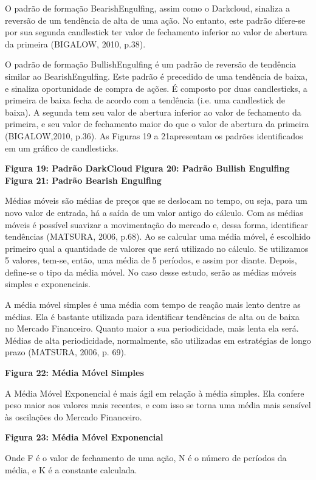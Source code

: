 O padrão de formação BearishEngulfing, assim como o Darkcloud, sinaliza a reversão de um tendência de alta de uma ação. No entanto, este padrão difere-se por sua segunda candlestick ter valor de fechamento inferior ao valor de abertura da primeira (BIGALOW, 2010, p.38).

O padrão de formação BullishEngulfing é um padrão de reversão de tendência similar ao BearishEngulfing. Este padrão é precedido de uma tendência de baixa, e sinaliza oportunidade de compra de ações. É composto por duas candlesticks, a primeira de baixa fecha de acordo com a tendência (i.e. uma candlestick de baixa). A segunda tem seu valor de abertura inferior ao valor de fechamento da primeira, e seu valor de fechamento maior do que o valor de abertura da primeira (BIGALOW,2010, p.36). As Figuras 19 a 21apresentam os padrões identificados em um gráfico de candlesticks.

\textbf{Figura 19: Padrão DarkCloud}
\textbf{Figura 20: Padrão Bullish Engulfing}
\textbf{Figura 21: Padrão Bearish Engulfing}


Médias móveis são médias de preços que se deslocam no tempo, ou seja, para um novo valor de entrada, há a saída de um valor antigo do cálculo. Com as médias móveis é possível suavizar a movimentação do mercado e, dessa forma, identificar tendências (MATSURA, 2006, p.68). Ao se calcular uma média móvel, é escolhido primeiro qual a quantidade de valores que será utilizado no cálculo. Se utilizamos 5 valores, tem-se, então, uma média de 5 períodos, e assim por diante. Depois, define-se o tipo da média móvel. No caso desse estudo, serão as médias móveis simples e exponenciais.

A média móvel simples é uma média com tempo de reação mais lento dentre as médias. Ela é bastante utilizada para identificar tendências de alta ou de baixa no Mercado Financeiro. Quanto maior a sua periodicidade, mais lenta ela será. Médias de alta periodicidade, normalmente, são utilizadas em estratégias de longo prazo (MATSURA, 2006, p. 69).

\textbf{Figura 22: Média Móvel Simples}

A Média Móvel Exponencial é mais ágil em relação à média simples. Ela confere peso maior aos valores mais recentes, e com isso se torna uma média mais sensível às oscilações do Mercado Financeiro.

\textbf{Figura 23: Média Móvel Exponencial}

Onde F é o valor de fechamento de uma ação, N é o número de períodos da média, e K é a constante calculada.

